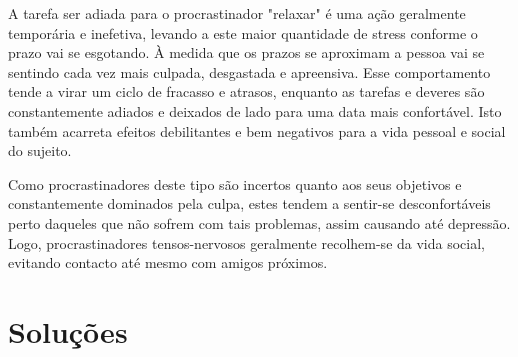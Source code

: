 \documentclass{report}
\begin{document}
A tarefa ser adiada para o procrastinador "relaxar" é uma ação geralmente temporária e inefetiva, levando a este maior quantidade de stress conforme o prazo vai se esgotando. À medida que os prazos se aproximam a pessoa vai se sentindo cada vez mais culpada, desgastada e apreensiva. Esse comportamento tende a virar um ciclo de fracasso e atrasos, enquanto as tarefas e deveres são constantemente adiados e deixados de lado para uma data mais confortável. Isto também acarreta efeitos debilitantes e bem negativos para a vida pessoal e social do sujeito.

Como procrastinadores deste tipo são incertos quanto aos seus objetivos e constantemente dominados pela culpa, estes tendem a sentir-se desconfortáveis perto daqueles que não sofrem com tais problemas, assim causando até depressão. Logo, procrastinadores tensos-nervosos geralmente recolhem-se da vida social, evitando contacto até mesmo com amigos próximos.


\label{chap.tenso}



\chapter{Soluções}
\label{chap.soluçoes}
\paragraph{}
\end{document}
